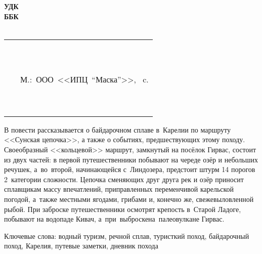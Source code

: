 {
\thispagestyle{empty}
%
\small{
\begin{flushleft}
\textbf{%
	УДК \UDK \\
	ББК \BBK \\
	\BibCode \\
}
\end{flushleft}
%
\vspace{1cm}
%
\begin{flushright}
{
\begin{tabular}[c]{>{\raggedright}m{14mm} >{\raggedright}m{95mm} }
	\textbf{\BibCode} & \MyVarAuthorName \tabularnewline
	~ & \MyVarBookName \tabularnewline
	~ & \MyVarBookNamesec \tabularnewline
	~ & М.:~ООО~<<ИПЦ~"`Маска"'>>,~\year\mdash \pageref{LastPage} c. \tabularnewline	
	~ & \textbf{\ISBN} \tabularnewline
	~ & \ciao{16+}
\end{tabular}
}
\end{flushright}
%
\vspace{0.5cm}
\hspace{1.0cm} В повести рассказывается о байдарочном сплаве в~Карелии по маршруту <<Сунская цепочка>>\cite{Шилов}, а также о событиях, предшествующих этому походу. Своеобразный <<кольцевой>> маршрут, замкнутый на посёлок Гирвас, состоит из двух частей: в первой путешественники побывают на череде озёр и небольших речушек, а~во~второй, начинающейся с~Линдозера, предстоит штурм 14 порогов 2~категории сложности. Цепочка сменяющих друг друга рек и озёр приносит сплавщикам массу впечатлений, приправленных переменчивой карельской погодой, а~также местными ягодами, грибами и, конечно же, свежевыловленной рыбой. При заброске путешественники осмотрят крепость в~Старой Ладоге, побывают на водопаде Кивач, а~при~выброске\mdash на~палеовулкане Гирвас.

\vspace{4mm}
\noindent Ключевые слова: водный туризм, речной сплав, туристкий поход, байдарочный поход, Карелия, путевые заметки, дневник похода
%
%
\vspace{4mm}
%

\noindent\makebox[\textwidth][s]{\textbf{\ISBN}\hfill{\copyright~\MyVarAuthorName,~\year}}
}

}